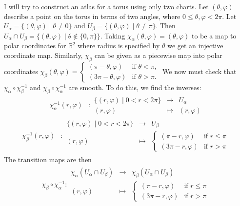 \documentclass[a4paper]{article}
\newcommand{\R}{\mathbb{R}}
\begin{document}
I will try to construct an atlas for a torus using only two charts. Let $(\theta, \varphi)$ describe a point on the torus in terms of two angles, where $0 \leq \theta, \varphi < 2\pi$. Let $U_\alpha = \{(\theta, \varphi) \mid \theta \neq 0\}$ and $U_\beta = \{(\theta, \varphi) \mid \theta \neq \pi\}$. Then $U_\alpha \cap U_\beta = \{(\theta, \varphi) \mid \theta \notin \{0, \pi\}\}$. Taking $\chi_\alpha(\theta, \varphi) = (\theta, \varphi)$ to be a map to polar coordinates for $\R^2$ where radius is specified by $\theta$ we get an injective coordinate map. Similarly, $\chi_\beta$ can be given as a piecewise map into polar coordinates $\chi_\beta(\theta, \varphi) = \left\{ \begin{array}{ll} (\pi - \theta, \varphi) & \text{if } \theta < \pi, \\ (3\pi - \theta, \varphi) & \text{if } \theta > \pi. \end{array} \right.$ We now must check that $\chi_\alpha \circ \chi_\beta^{-1}$ and $\chi_\beta \circ \chi_\alpha^{-1}$ are smooth. To do this, we find the inverses:
\begin{align}
    \chi_\alpha^{-1}(r, \varphi) &: \begin{array}{rcl} \{(r, \varphi) \mid 0 < r < 2\pi\} & \to & U_\alpha \\ (r, \varphi) & \mapsto & (r, \varphi) \end{array}
\end{align}
\begin{align}
    \chi_\beta^{-1}(r, \varphi) &: \begin{array}{rcl} \{(r, \varphi) \mid 0 < r < 2\pi\} & \to & U_\beta \\ (r, \varphi) & \mapsto & \left\{ \begin{array}{ll} (\pi - r, \varphi) & \text{if } r \leq \pi \\ (3\pi - r, \varphi) & \text{if } r > \pi \end{array} \right. \end{array}
\end{align}
The transition maps are then
\begin{align}
    \chi_\beta \circ \chi_\alpha^{-1} : \begin{array}{rcl} \chi_\alpha(U_\alpha \cap U_\beta) & \to & \chi_\beta(U_\alpha \cap U_\beta) \\ (r, \varphi) & \mapsto & \left\{ \begin{array}{ll} (\pi - r, \varphi) & \text{if } r \leq \pi \\ (3\pi - r, \varphi) & \text{if } r > \pi \end{array} \right. \end{array}
\end{align}
\end{document}

